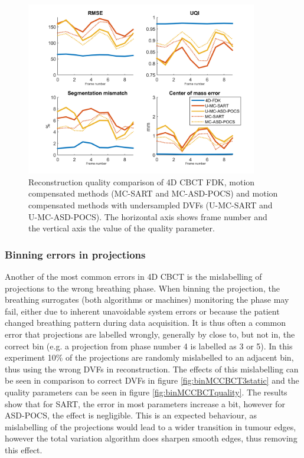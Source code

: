 \begin{figure}
\begin{center}

\includegraphics[width=0.9\textwidth]{accuracyMC/UMCCBCTparams.png} 


\end{center}

\caption[Reconstruction quality comparison of motion compensation]{\label{fig:UMCCBCTquality} Reconstruction quality comparison of 4D CBCT FDK, motion compensated methods (MC-SART and MC-ASD-POCS) and motion compensated methods with undersampled DVFs (U-MC-SART and U-MC-ASD-POCS). The horizontal axis shows frame number and the vertical axis the value of the quality parameter.} 
\end{figure}
\subsubsection{Binning errors in projections}
Another of the most common errors in 4D CBCT is the mislabelling of projections to the wrong breathing phase. When binning the projection, the breathing surrogates (both algorithms or machines) monitoring the phase may fail, either due to inherent unavoidable system errors or because the patient changed breathing pattern during data acquisition. It is thus often a common error that projections are labelled wrongly, generally by close to, but not in, the correct bin (e.g. a projection from phase number 4 is labelled as 3 or 5). In this experiment 10\% of the projections are randomly mislabelled to an adjacent bin, thus using the wrong DVFs in reconstruction. The effects of this mislabelling can be seen in comparison to correct DVFs in figure \ref{fig:binMCCBCT3static} and the quality parameters can be seen in figure \ref{fig:binMCCBCTquality}. The results show that for SART, the error in most parameters increase a bit, however for ASD-POCS, the effect is negligible. This is an expected behaviour, as mislabelling of the projections would lead to a wider transition in tumour edges, however the total variation algorithm does sharpen smooth edges, thus removing this effect.


